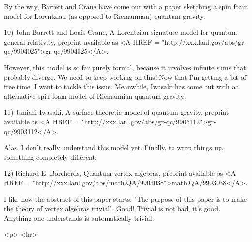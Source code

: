 By the way, Barrett and Crane have come out with a paper sketching a
spin foam model for Lorentzian (as opposed to Riemannian) quantum
gravity:

10) John Barrett and Louis Crane, A Lorentzian signature model for quantum
general relativity, preprint available as <A HREF =
"http://xxx.lanl.gov/abs/gr-qc/9904025">gr-qc/9904025</A>.

However, this model is so far purely formal, because it involves
infinite sums that probably diverge.  We need to keep working on this!
Now that I'm getting a bit of free time, I want to tackle this issue.
Meanwhile, Iwasaki has come out with an alternative spin foam model of
Riemannian quantum gravity:

11) Junichi Iwasaki, A surface theoretic model of quantum gravity, preprint
available as <A HREF =
"http://xxx.lanl.gov/abs/gr-qc/9903112">gr-qc/9903112</A>.

Alas, I don't really understand this model yet.  Finally, to wrap
things up, something completely different:

12) Richard E. Borcherds, Quantum vertex algebras, preprint available
as <A HREF = "http://xxx.lanl.gov/abs/math.QA/9903038">math.QA/9903038</A>.
 

I like how the abstract of this paper starts: "The purpose of this paper
is to make the theory of vertex algebras trivial".  Good!  Trivial is
not bad, it's good.  Anything one understands is automatically trivial.




<p> <hr>



